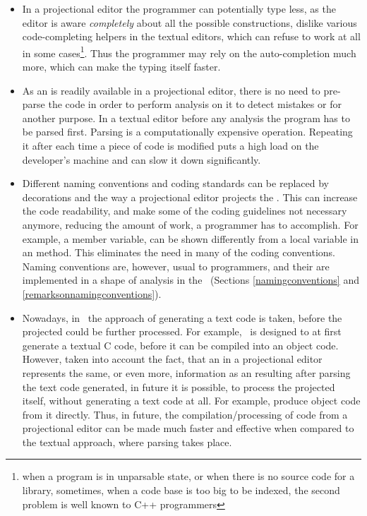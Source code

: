   \begin{itemize}
   \item In a projectional editor the programmer can potentially type less, as the editor is aware \emph{completely}
  about all the possible constructions, dislike various code-completing helpers in the textual editors, which can refuse 
  to work at all in some cases\footnote{when a program is in unparsable state, or when there is no source code for a library,
  sometimes, when a code base is too big to be indexed, the second problem is well known to C++ programmers}. 
  Thus the programmer may rely on the auto-completion much more, which
  can make the typing itself faster.

  
  \item As an  is readily available  in a projectional editor, there is no need to pre-parse the code in order to 
  perform analysis on it to detect mistakes or for another purpose. In a textual editor before any analysis the program has to be 
  parsed first. Parsing is a computationally expensive operation. Repeating it after each time a piece of code is modified 
  puts a high load on the developer's machine and can slow it down significantly. 
  
  
  \item Different naming conventions and coding standards can be replaced by decorations and the way a projectional editor
  projects the . This can increase the code readability, and make some of the coding guidelines not necessary anymore,
  reducing the amount of work, a programmer has to accomplish.
  For example, a member variable, can be shown differently from a local variable in an method. This 
  eliminates the need in many of the coding conventions. Naming conventions are, however, usual to programmers, and their are
  implemented in a shape of analysis in the \pcpp\ (Sections \ref{namingconventions} and \ref{remarksonnamingconventions}).
  
  
  \item Nowadays, in \jbmps\ the approach of generating a text code is taken, before the projected  could be further processed.
  For example, \mbdr\ is designed to at first generate a textual C code, before it can be compiled into an object code.
  However, taken into account the fact, that an  in a projectional editor represents the same, or even more, information 
  as an  resulting after parsing the text code generated, in future it is possible, to process the projected  itself,
  without generating a text code at all. For example, produce object code from it directly. Thus, in future, the compilation/processing
  of code from a projectional editor can be made much faster and effective when compared to the textual approach, where parsing takes place.
 
  
  \end{itemize}
  
